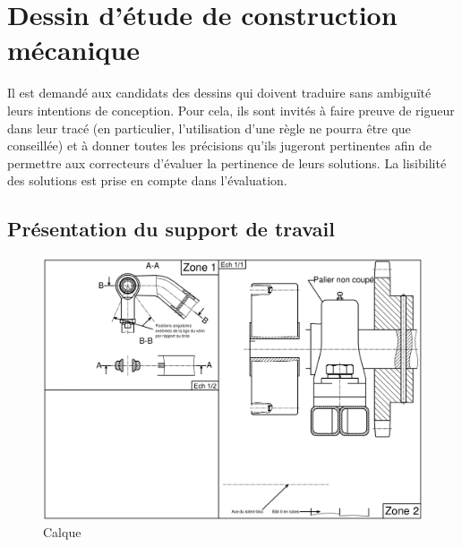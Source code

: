 


\newpage

\section{Dessin d'étude de construction mécanique}

Il est demandé aux candidats des dessins qui doivent traduire sans ambiguïté leurs intentions
de conception. Pour cela, ils sont invités à faire preuve de rigueur dans leur tracé (en particulier,
l'utilisation d'une règle ne pourra être que conseillée) et à donner toutes les précisions qu'ils
jugeront pertinentes afin de permettre aux correcteurs d'évaluer la pertinence de leurs
solutions. La lisibilité des solutions est prise en compte dans l'évaluation.

\subsection{Présentation du support de travail}

\begin{figure}[!h]
 \centering\includegraphics[width=0.7\linewidth]{img/fig13}
 \caption{Calque}
 \label{fig13}
\end{figure}

\vspace{-30pt}

